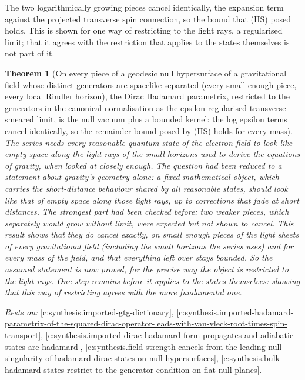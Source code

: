 \documentclass[11pt]{article}
\newtheorem{theorem}{Theorem}[section]
\theoremstyle{definition}
\theoremstyle{plain}
\begin{document}
The two logarithmically growing pieces cancel identically, the expansion term against the projected transverse spin connection, so the bound that (HS) posed holds. This is shown for one way of restricting to the light rays, a regularised limit; that it agrees with the restriction that applies to the states themselves is not part of it.

\begin{theorem}[On every piece of a geodesic null hypersurface of a gravitational field whose distinct generators are spacelike separated (every small enough piece, every local Rindler horizon), the Dirac Hadamard parametrix, restricted to the generators in the canonical normalisation as the epsilon-regularised transverse-smeared limit, is the null vacuum plus a bounded kernel: the log epsilon terms cancel identically, so the remainder bound posed by (HS) holds for every mass]\label{c:synthesis.restricted-dirac-hadamard-parametrix-on-a-null-hypersurface-is-the-null-vacuum-plus-a-bounded-kernel}
The series needs every reasonable quantum state of the electron field to look like empty space along the light rays of the small horizons used to derive the equations of gravity, when looked at closely enough. The question had been reduced to a statement about gravity's geometry alone: a fixed mathematical object, which carries the short-distance behaviour shared by all reasonable states, should look like that of empty space along those light rays, up to corrections that fade at short distances. The strongest part had been checked before; two weaker pieces, which separately would grow without limit, were expected but not shown to cancel. This result shows that they do cancel exactly, on small enough pieces of the light sheets of every gravitational field (including the small horizons the series uses) and for every mass of the field, and that everything left over stays bounded. So the assumed statement is now proved, for the precise way the object is restricted to the light rays. One step remains before it applies to the states themselves: showing that this way of restricting agrees with the more fundamental one.
\end{theorem}
\noindent\emph{Rests on:} \ref{c:synthesis.imported-gtg-dictionary}, \ref{c:synthesis.imported-hadamard-parametrix-of-the-squared-dirac-operator-leads-with-van-vleck-root-times-spin-transport}, \ref{c:synthesis.imported-dirac-hadamard-form-propagates-and-adiabatic-states-are-hadamard}, \ref{c:synthesis.field-strength-cancels-from-the-leading-null-singularity-of-hadamard-dirac-states-on-null-hypersurfaces}, \ref{c:synthesis.bulk-hadamard-states-restrict-to-the-generator-condition-on-flat-null-planes}.
\end{document}
